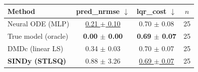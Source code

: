\begin{tabular}{lccc}
\toprule
Method & pred\_nrmse $\downarrow$ & lqr\_cost $\downarrow$ & $n$ \\
\midrule
Neural ODE (MLP) & \underline{0.21 $\pm$ 0.10} & 0.70 $\pm$ 0.08 & 25 \\
True model (oracle) & \textbf{0.00 $\pm$ 0.00} & \textbf{0.69 $\pm$ 0.07} & 25 \\
DMDc (linear LS) & 0.34 $\pm$ 0.03 & 0.70 $\pm$ 0.07 & 25 \\
\textbf{SINDy (STLSQ)} & 0.88 $\pm$ 3.26 & \underline{0.69 $\pm$ 0.07} & 25 \\
\bottomrule
\end{tabular}
